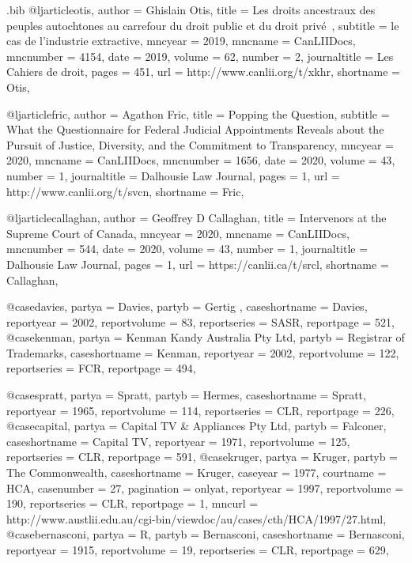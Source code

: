 \begin{filecontents*}[overwrite]{\jobname.bib}
@ljarticle{otis,	author =  {Ghislain Otis},	title =  {Les droits ancestraux des peuples autochtones au carrefour du droit public et du droit privé~},	subtitle =  {le cas de l’industrie extractive},	mncyear =  {2019},	mncname =  {CanLIIDocs},	mncnumber =  {4154},	date =  {2019},	volume =  {62},	number =  {2},	journaltitle =  {Les Cahiers de droit},	pages =  {451},	url =  {http://www.canlii.org/t/xkhr},	shortname =  {Otis},		}

@ljarticle{fric,	author =  {Agathon Fric},	title =  {Popping the Question},	subtitle =  {What the Questionnaire for Federal Judicial Appointments Reveals about the Pursuit of Justice, Diversity, and the Commitment to Transparency},	mncyear =  {2020},	mncname =  {CanLIIDocs},	mncnumber =  {1656},	date =  {2020},	volume =  {43},	number =  {1},	journaltitle =  {Dalhousie Law Journal},	pages =  {1},	url =  {http://www.canlii.org/t/svcn},	shortname =  {Fric},		}


@ljarticle{callaghan,	author =  {Geoffrey D Callaghan},	title =  {Intervenors at the Supreme Court of Canada},		mncyear =  {2020},	mncname =  {CanLIIDocs},	mncnumber =  {544},	date =  {2020},	volume =  {43},	number =  {1},	journaltitle =  {Dalhousie Law Journal},	pages =  {1},	url =  {https://canlii.ca/t/srcl},		shortname =  {Callaghan},	}


@case{davies,	partya =  {Davies},	partyb =  {Gertig },	caseshortname =  {Davies},	reportyear =  {2002},	reportvolume =  {83},		reportseries =  {SASR},	reportpage =  {521},		}
@case{kenman,	partya =  {Kenman Kandy Australia Pty Ltd},	partyb =  {Registrar of Trademarks},	caseshortname =  {Kenman},	reportyear =  {2002},	reportvolume =  {122},		reportseries =  {FCR},	reportpage =  {494},		}

@case{spratt,	partya =  {Spratt},	partyb =  {Hermes},	caseshortname =  {Spratt},	reportyear =  {1965},	reportvolume =  {114},		reportseries =  {CLR},	reportpage =  {226},		}
@case{capital,	partya =  {Capital TV \& Appliances Pty Ltd},	partyb =  {Falconer},	caseshortname =  {Capital TV},	reportyear =  {1971},	reportvolume =  {125},		reportseries =  {CLR},	reportpage =  {591},		}
@case{kruger,	partya =  {Kruger},	partyb =  {The Commonwealth},	caseshortname =  {Kruger},	caseyear =  {1977},	courtname =  {HCA},	casenumber =  {27},	pagination =  {onlyat},	reportyear =  {1997},	reportvolume =  {190},		reportseries =  {CLR},	reportpage =  {1},			mncurl =  {http://www.austlii.edu.au/cgi-bin/viewdoc/au/cases/cth/HCA/1997/27.html},											}
@case{bernasconi,	partya =  {R},	partyb =  {Bernasconi},	caseshortname =  {Bernasconi},	reportyear =  {1915},	reportvolume =  {19},		reportseries =  {CLR},	reportpage =  {629},		}



\end{filecontents*}
